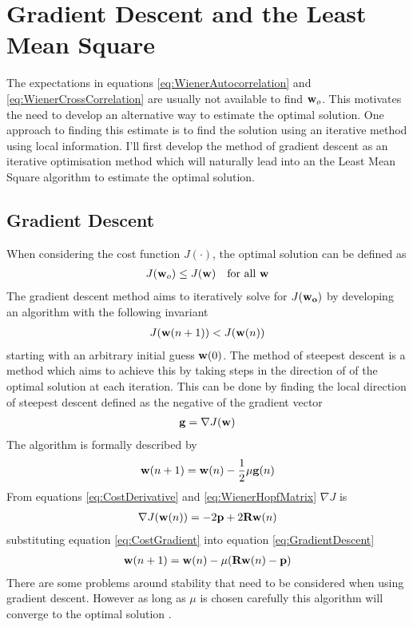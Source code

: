 \section{Gradient Descent and the Least Mean Square}
The expectations in equations \ref{eq:WienerAutocorrelation} %
and \ref{eq:WienerCrossCorrelation} are usually not %
available to find $\bold{w}_{o}$. This motivates the %
need to develop an alternative way to estimate the %
optimal solution. One approach to finding this estimate %
is to find the solution using an iterative method using %
local information. I'll first develop the method of %
gradient descent as an iterative optimisation method %
which will naturally lead into an the Least Mean Square %
algorithm to estimate the optimal solution.
\subsection{Gradient Descent}
When considering the cost function $J(\cdot)$, %
the optimal solution can be defined as
\begin{align}
	J(\bold{w}_{o}) \leq J(\bold{w})\quad
	\text{for all }\bold{w}
\end{align}
The gradient descent method aims to iteratively %
solve for $J(\bold{w_{o}})$ by developing an %
algorithm with the following invariant
\begin{align}
	J(\bold{w}(n+1)) < J(\bold{w}(n))
\end{align}
starting with an arbitrary initial guess $\bold{w}(0)$. %
The method of steepest descent is a method which aims %
to achieve this by taking steps in the direction of %
of the optimal solution at each iteration. This can %
be done by finding the local direction of steepest %
descent defined as the negative of the gradient vector %
\begin{align}
	\bold{g} = \nabla J(\bold{w})
\end{align}
The algorithm is formally described by
\begin{align}
	\bold{w}(n+1) = \bold{w}(n) - \frac{1}{2}
	\mu\bold{g}(n)
	\label{eq:GradientDescent}
\end{align}
From equations \ref{eq:CostDerivative} and %
\ref{eq:WienerHopfMatrix} $\nabla J$ is
\begin{align}
	\nabla J(\bold{w}(n)) = 
	-2\bold{p} + 2\bold{R}\bold{w}(n)
	\label{eq:CostGradient}
\end{align}
substituting equation \ref{eq:CostGradient} into %
equation \ref{eq:GradientDescent}
\begin{align}
	\bold{w}(n+1) = \bold{w}(n) - \mu(
	\bold{R}\bold{w}(n) - \bold{p})
	\label{eq:WienerGradientDescent}
\end{align}
There are some problems around stability that %
need to be considered when using gradient descent. %
However as long as $\mu$ is chosen carefully this %
algorithm will converge to the optimal solution \cite{Hay02}.
